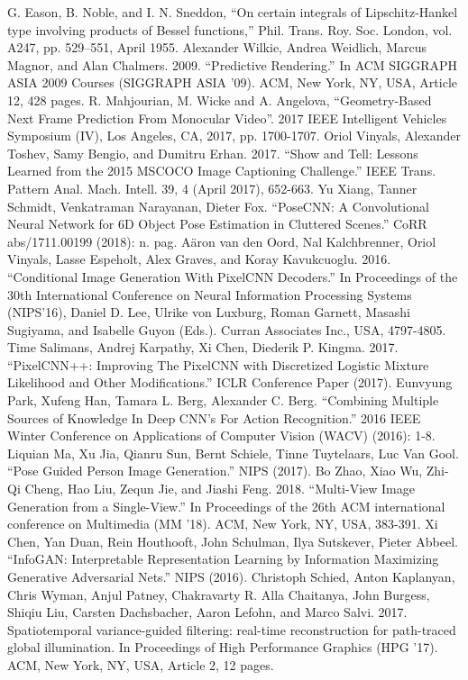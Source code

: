 \documentclass[conference]{IEEEtran}
\begin{document}
\begin{thebibliography}{00}
 G. Eason, B. Noble, and I. N. Sneddon, ``On certain integrals of Lipschitz-Hankel type involving products of Bessel functions,'' Phil. Trans. Roy. Soc. London, vol. A247, pp. 529--551, April 1955.
 Alexander Wilkie, Andrea Weidlich, Marcus Magnor, and Alan Chalmers. 2009. ``Predictive Rendering.'' In ACM SIGGRAPH ASIA 2009 Courses (SIGGRAPH ASIA '09). ACM, New York, NY, USA, Article 12, 428 pages.
 R. Mahjourian, M. Wicke and A. Angelova, ``Geometry-Based Next Frame Prediction From Monocular Video''. 2017 IEEE Intelligent Vehicles Symposium (IV), Los Angeles, CA, 2017, pp. 1700-1707.
 Oriol Vinyals, Alexander Toshev, Samy Bengio, and Dumitru Erhan. 2017. ``Show and Tell: Lessons Learned from the 2015 MSCOCO Image Captioning Challenge.'' IEEE Trans. Pattern Anal. Mach. Intell. 39, 4 (April 2017), 652-663.
 Yu Xiang, Tanner Schmidt, Venkatraman Narayanan, Dieter Fox. ``PoseCNN: A Convolutional Neural Network for 6D Object Pose Estimation in Cluttered Scenes.'' CoRR abs/1711.00199 (2018): n. pag.
 A\"{a}ron van den Oord, Nal Kalchbrenner, Oriol Vinyals, Lasse Espeholt, Alex Graves, and Koray Kavukcuoglu. 2016. ``Conditional Image Generation With PixelCNN Decoders.'' In Proceedings of the 30th International Conference on Neural Information Processing Systems (NIPS'16), Daniel D. Lee, Ulrike von Luxburg, Roman Garnett, Masashi Sugiyama, and Isabelle Guyon (Eds.). Curran Associates Inc., USA, 4797-4805.
 Time Salimans, Andrej Karpathy, Xi Chen, Diederik P. Kingma. 2017. ``PixelCNN++: Improving The PixelCNN with Discretized Logistic Mixture Likelihood and Other Modifications.'' ICLR Conference Paper (2017).
 Eunvyung Park, Xufeng Han, Tamara L. Berg, Alexander C. Berg. ``Combining Multiple Sources of Knowledge In Deep CNN's For Action Recognition.'' 2016 IEEE Winter Conference on Applications of Computer Vision (WACV) (2016): 1-8.
 Liquian Ma, Xu Jia, Qianru Sun, Bernt Schiele, Tinne Tuytelaars, Luc Van Gool. ``Pose Guided Person Image Generation.'' NIPS (2017).
 Bo Zhao, Xiao Wu, Zhi-Qi Cheng, Hao Liu, Zequn Jie, and Jiashi Feng. 2018. ``Multi-View Image Generation from a Single-View.'' In Proceedings of the 26th ACM international conference on Multimedia (MM '18). ACM, New York, NY, USA, 383-391.
 Xi Chen, Yan Duan, Rein Houthooft, John Schulman, Ilya Sutskever, Pieter Abbeel. ``InfoGAN: Interpretable Representation Learning by Information Maximizing Generative Adversarial Nets.'' NIPS (2016).
 Christoph Schied, Anton Kaplanyan, Chris Wyman, Anjul Patney, Chakravarty R. Alla Chaitanya, John Burgess, Shiqiu Liu, Carsten Dachsbacher, Aaron Lefohn, and Marco Salvi. 2017. Spatiotemporal variance-guided filtering: real-time reconstruction for path-traced global illumination. In Proceedings of High Performance Graphics (HPG '17). ACM, New York, NY, USA, Article 2, 12 pages.
\end{thebibliography}
\end{document}

